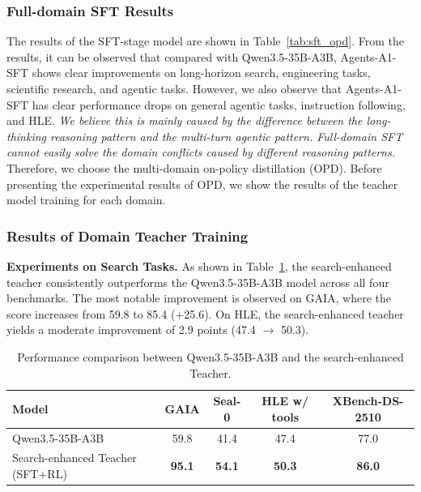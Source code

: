\documentclass{llmxive}
\providecommand{\ProjectName}{Agents-A1}
\providecommand{\arraystretch}{1.4}
\begin{document}
\subsubsection{Full-domain SFT Results} 
\label{sec:sft_results}

The results of the SFT-stage model are shown in Table~\ref{tab:sft_opd}. From the results, it can be observed that compared with Qwen3.5-35B-A3B, \ProjectName-SFT shows clear improvements on long-horizon search, engineering tasks, scientific research, and agentic tasks. However, we also observe that \ProjectName-SFT has clear performance drops on general agentic tasks, instruction following, and HLE. \textit{We believe this is mainly caused by the difference between the long-thinking reasoning pattern and the multi-turn agentic pattern. Full-domain SFT cannot easily solve the domain conflicts caused by different reasoning patterns.} Therefore, we choose the multi-domain on-policy distillation (OPD). Before presenting the experimental results of OPD, we show the results of the teacher model training for each domain.

\subsubsection{Results of Domain Teacher Training} 
\textbf{Experiments on Search Tasks.} As shown in Table~\ref{tab:search_rl_results}, the search-enhanced teacher consistently outperforms the Qwen3.5-35B-A3B model across all four benchmarks. The most notable improvement is observed on GAIA, where the score increases from 59.8 to 85.4 (+25.6). On HLE, the search-enhanced teacher yields a moderate improvement of 2.9 points (47.4 $\to$ 50.3).

\begin{table}[]
    \centering
    \footnotesize
    \setlength{\tabcolsep}{8pt}
    \renewcommand{\arraystretch}{1.4}
    \begin{tabular}{@{}lcccc@{}}
    \toprule
    \textbf{Model} & \textbf{GAIA} & \textbf{Seal-0} & \textbf{HLE w/ tools} & \textbf{XBench-DS-2510} \\
    \midrule
    Qwen3.5-35B-A3B & 59.8 & 41.4 & 47.4 & 77.0 \\
    Search-enhanced Teacher (SFT+RL) & \textbf{95.1} & \textbf{54.1} & \textbf{50.3} & \textbf{86.0} \\
    \bottomrule
    \end{tabular}
\caption{Performance comparison between Qwen3.5-35B-A3B and the search-enhanced Teacher.}
\label{tab:search_rl_results}
\end{table}
\end{document}
